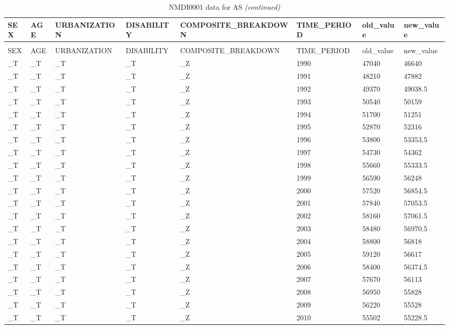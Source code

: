 
\begin{longtable}[t]{llllllll}
\caption{NMDI0001 data for AS}\\
\toprule
SEX & AGE & URBANIZATION & DISABILITY & COMPOSITE\_BREAKDOWN & TIME\_PERIOD & old\_value & new\_value\\
\midrule
\endfirsthead
\caption[]{NMDI0001 data for AS \textit{(continued)}}\\
\toprule
SEX & AGE & URBANIZATION & DISABILITY & COMPOSITE\_BREAKDOWN & TIME\_PERIOD & old\_value & new\_value\\
\midrule
\endhead

\endfoot
\bottomrule
\endlastfoot
\_T & \_T & \_T & \_T & \_Z & 1990 & 47040 & 46640\\
\_T & \_T & \_T & \_T & \_Z & 1991 & 48210 & 47882\\
\_T & \_T & \_T & \_T & \_Z & 1992 & 49370 & 49038.5\\
\_T & \_T & \_T & \_T & \_Z & 1993 & 50540 & 50159\\
\_T & \_T & \_T & \_T & \_Z & 1994 & 51700 & 51251\\
\addlinespace
\_T & \_T & \_T & \_T & \_Z & 1995 & 52870 & 52316\\
\_T & \_T & \_T & \_T & \_Z & 1996 & 53800 & 53353.5\\
\_T & \_T & \_T & \_T & \_Z & 1997 & 54730 & 54362\\
\_T & \_T & \_T & \_T & \_Z & 1998 & 55660 & 55333.5\\
\_T & \_T & \_T & \_T & \_Z & 1999 & 56590 & 56248\\
\addlinespace
\_T & \_T & \_T & \_T & \_Z & 2000 & 57520 & 56854.5\\
\_T & \_T & \_T & \_T & \_Z & 2001 & 57840 & 57053.5\\
\_T & \_T & \_T & \_T & \_Z & 2002 & 58160 & 57061.5\\
\_T & \_T & \_T & \_T & \_Z & 2003 & 58480 & 56970.5\\
\_T & \_T & \_T & \_T & \_Z & 2004 & 58800 & 56818\\
\addlinespace
\_T & \_T & \_T & \_T & \_Z & 2005 & 59120 & 56617\\
\_T & \_T & \_T & \_T & \_Z & 2006 & 58400 & 56374.5\\
\_T & \_T & \_T & \_T & \_Z & 2007 & 57670 & 56113\\
\_T & \_T & \_T & \_T & \_Z & 2008 & 56950 & 55828\\
\_T & \_T & \_T & \_T & \_Z & 2009 & 56220 & 55528\\
\addlinespace
\_T & \_T & \_T & \_T & \_Z & 2010 & 55502 & 55228.5\\

\end{longtable}
